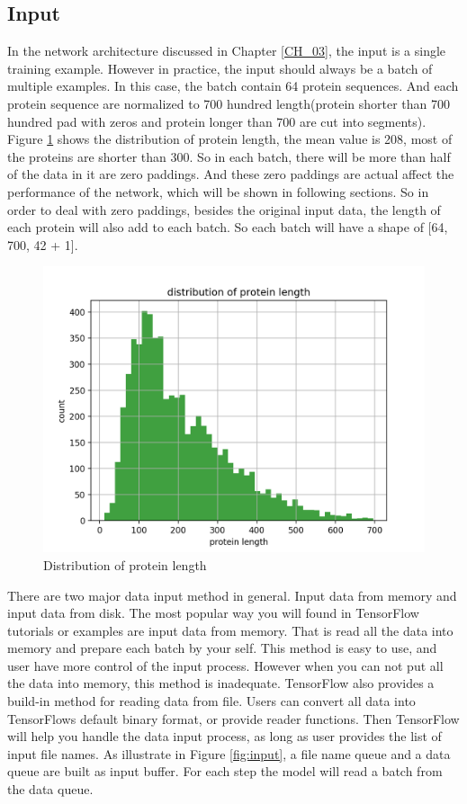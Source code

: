 \subsection{Input}
In the network architecture discussed in Chapter \ref{CH_03}, the input is a single training example. However in practice, the input should always be a batch of multiple examples. In this case, the batch contain 64 protein sequences. And each protein sequence are normalized to 700 hundred length(protein shorter than 700 hundred pad with zeros and protein longer than 700 are cut into segments).  Figure \ref{fig:len_dist} shows the distribution of protein length, the mean value is 208, most of the proteins are shorter than 300. So in each batch, there will be more than half of the data in it are zero paddings. And these zero paddings are actual affect the performance of the network, which will be shown in following sections. So in order to deal with zero paddings, besides the original input data, the length of each protein will also add to each batch. So each batch will have a shape of [64, 700, 42 + 1].

\begin{figure}[H] 
	\centering
	\includegraphics[width=5in]{Figures/length_distribution}
	\caption[Distribution of protein length]{Distribution of protein length}
	\label{fig:len_dist}
\end{figure}

There are two major data input method in general. Input data from memory and input data from disk. The most popular way you will found in TensorFlow tutorials or examples are input data from memory. That is read all the data into memory and prepare each batch by your self. This method is easy to use, and user have more control of the input process. However when you can not put all the data into memory, this method is inadequate. TensorFlow also provides a build-in method for reading data from file. Users can convert all data into TensorFlows default binary format, or provide reader functions. Then TensorFlow will help you handle the data input process, as long as user provides the list of input file names. As illustrate in Figure \ref{fig:input}, a file name queue and a data queue are built as input buffer. For each step the model will read a batch from the data queue. 

